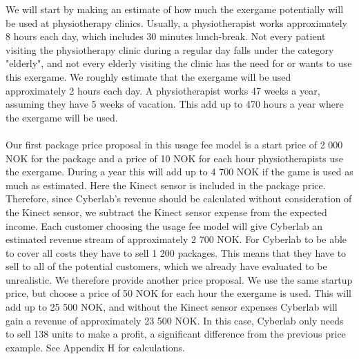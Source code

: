 We will start by making an estimate of how much the exergame potentially will be used at physiotherapy clinics. Usually, a physiotherapist works approximately 8 hours each day, which includes 30 minutes lunch-break. Not every patient visiting the physiotherapy clinic during a regular day falls under the category "elderly", and not every elderly visiting the clinic has the need for or wants to use this exergame. We roughly estimate that the exergame will be used approximately 2 hours each day. A physiotherapist works 47 weeks a year, assuming they have 5 weeks of vacation. This add up to 470 hours a year where the exergame will be used.\\ \\
Our first package price proposal in this usage fee model is a start price of 2 000 NOK for the package and a price of 10 NOK for each hour physiotherapists use the exergame. During a year this will add up to 4 700 NOK if the game is used as much as estimated. Here the Kinect sensor is included in the package price. Therefore, since Cyberlab’s revenue should be calculated without consideration of the Kinect sensor, we subtract the Kinect sensor expense from the expected income. Each customer choosing the usage fee model will give Cyberlab an estimated revenue stream of approximately 2 700 NOK. For Cyberlab to be able to cover all costs they have to sell 1 200 packages. This means that they have to sell to all of the potential customers, which we already have evaluated to be unrealistic. We therefore provide another price proposal. We use the same startup price, but choose a price of 50 NOK for each hour the exergame is used. This will add up to 25 500 NOK, and without the Kinect sensor expenses Cyberlab will gain a revenue of approximately 23 500 NOK. In this case, Cyberlab only needs to sell 138 units to make a profit, a significant difference from the previous price example. See Appendix H for calculations. \\ \\

